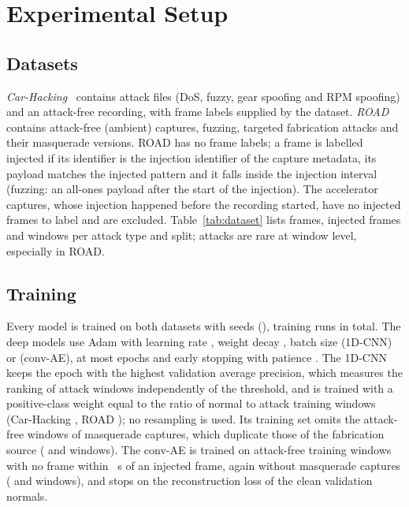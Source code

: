 \section{Experimental Setup}\label{sec:setup}

\subsection{Datasets}
\emph{Car-Hacking}~\cite{song2020dcnn} contains \CHAttackFiles{} attack files (DoS, fuzzy, gear spoofing and RPM
spoofing) and an attack-free recording, with frame labels supplied by the dataset. \emph{ROAD}~\cite{verma2024road}
contains attack-free (ambient) captures, fuzzing, targeted fabrication attacks and their masquerade versions. ROAD
has no frame labels; a frame is labelled injected if its identifier is the injection identifier of the capture
metadata, its payload matches the injected pattern and it falls inside the injection interval (fuzzing: an
all-ones payload after the start of the injection). The \ExcludedROAD{} accelerator captures, whose injection
happened before the recording started, have no injected frames to label and are excluded. Table~\ref{tab:dataset}
lists frames, injected frames and windows per attack type and split; attacks are rare at window level, especially
in ROAD.



\subsection{Training}
Every model is trained on both datasets with \NSeeds{} seeds (\Seeds), \NRuns{} training runs in total. The deep
models use Adam with learning rate \LearningRate, weight decay \WeightDecay, batch size \BatchSize{} (1D-CNN) or
\AEBatchSize{} (conv-AE), at most \MaxEpochs{} epochs and early stopping with patience \Patience. The 1D-CNN keeps
the epoch with the highest validation average precision, which measures the ranking of attack windows independently
of the threshold, and is trained with a positive-class weight equal to the ratio of normal to attack training
windows (Car-Hacking \PosWeightCH, ROAD \PosWeightROAD); no resampling is used. Its training set omits the
attack-free windows of masquerade captures, which duplicate those of the fabrication source
(\CNNTrainWindowsCH{} and \CNNTrainWindowsROAD{} windows). The conv-AE is trained on attack-free training windows
with no frame within \NormalMarginS~s of an injected frame, again without masquerade captures (\AETrainWindowsCH{}
and \AETrainWindowsROAD{} windows), and stops on the reconstruction loss of the clean validation normals.

